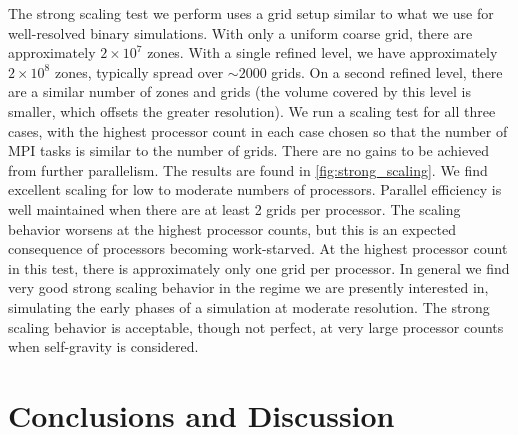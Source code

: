 \documentclass[iop,numberedappendix]{../emulateapj}
\begin{document}
The strong scaling test we perform uses a grid setup similar to what we 
use for well-resolved binary simulations. With only a uniform coarse grid, 
there are approximately $2 \times 10^7$ zones. With a single refined level, 
we have approximately $2 \times 10^8$ zones, typically spread over $\sim 2000$ grids.
On a second refined level, there are a similar number of zones and grids 
(the volume covered by this level is smaller, which offsets the greater resolution).
We run a scaling test for all three cases, with the 
highest processor count in each case chosen so that the number of 
MPI tasks is similar to the number of grids. There are no gains 
to be achieved from further parallelism. The results are found in 
\autoref{fig:strong_scaling}. We find excellent scaling for low to moderate numbers 
of processors. Parallel efficiency is well maintained when there are 
at least 2 grids per processor. The 
scaling behavior worsens at the highest processor counts, but this is 
an expected consequence of processors becoming work-starved. At the highest 
processor count in this test, there is approximately only one grid per processor. In general 
we find very good strong scaling behavior in the regime we are presently 
interested in, simulating the early phases of a simulation at moderate 
resolution. The strong scaling behavior is acceptable, though not perfect, 
at very large processor counts when self-gravity is considered.

\section{Conclusions and Discussion}\label{sec:Conclusions and Discussion}
\end{document}

